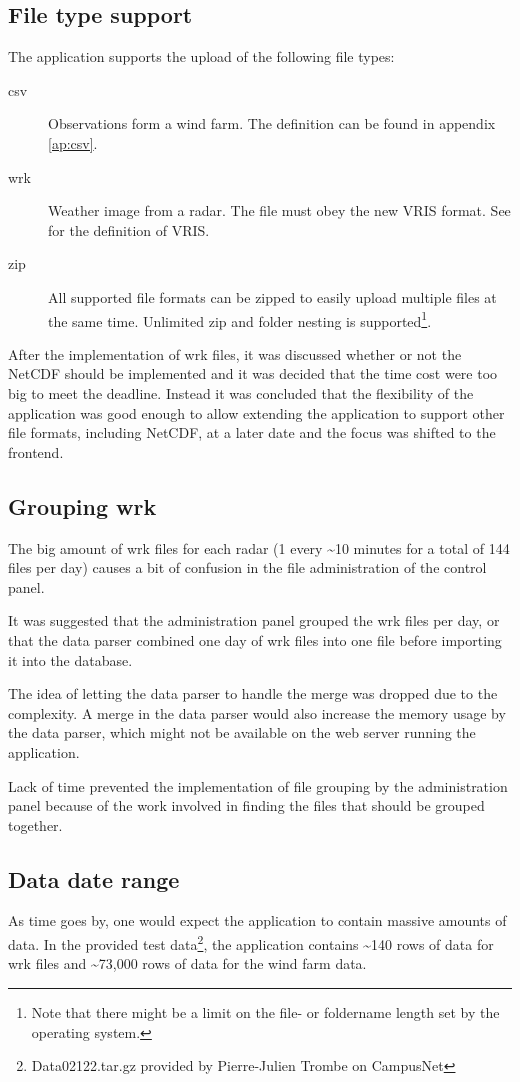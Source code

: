 \subsection{File type support}
The application supports the upload of the following file types:
\begin{description}
\item[csv] Observations form a wind farm. The definition can be found in appendix \ref{ap:csv}.
\item[wrk] Weather image from a radar. The file must obey the new VRIS format. See \cite{VRIS} for the definition of VRIS.
\item[zip] All supported file formats can be zipped to easily upload multiple files at the same time. Unlimited zip and folder nesting is supported\footnote{Note that there might be a limit on the file- or foldername length set by the operating system.}.
\end{description}

After the implementation of wrk files, it was discussed whether or not the NetCDF should be implemented and it was decided that the time cost were too big to meet the deadline. Instead it was concluded that the flexibility of the application was good enough to allow extending the application to support other file formats, including NetCDF, at a later date and the focus was shifted to the frontend.

\subsection{Grouping wrk}
The big amount of wrk files for each radar (1 every \textasciitilde 10 minutes for a total of 144 files per day) causes a bit of confusion in the file administration of the control panel.

It was suggested that the administration panel grouped the wrk files per day, or that the data parser combined one day of wrk files into one file before importing it into the database.

The idea of letting the data parser to handle the merge was dropped due to the complexity. A merge in the data parser would also increase the memory usage by the data parser, which might not be available on the web server running the application.

Lack of time prevented the implementation of file grouping by the administration panel because of the work involved in finding the files that should be grouped together.

\subsection{Data date range}
As time goes by, one would expect the application to contain massive amounts of data.
In the provided test data\footnote{Data02122.tar.gz provided by Pierre-Julien Trombe on CampusNet}, the application contains \textasciitilde 140 rows of data for \textsf{wrk} files and \textasciitilde 73,000 rows of data for the wind farm data.

